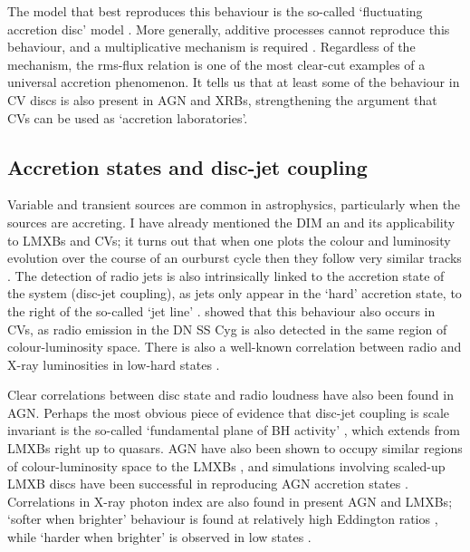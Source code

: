 The model that best reproduces this behaviour is the so-called
`fluctuating accretion disc' model \citep{lyubarskii1997,kotov2001,
arevalo2006,hogg2015}. More generally,
additive processes cannot reproduce this behaviour, and a multiplicative
mechanism is required \citep{uttley2005}. 
Regardless of the mechanism, the rms-flux relation is one of the most
clear-cut examples of a universal accretion phenomenon. 
It tells us that at least some of the behaviour in CV discs
is also present in AGN and XRBs, strengthening the argument that CVs
can be used as `accretion laboratories'. 


\subsection{Accretion states and disc-jet coupling}
\label{sec:disc-jet}

Variable and transient sources are common in astrophysics, particularly
when the sources are accreting. I have already mentioned the DIM an
and its applicability to LMXBs and CVs; it turns out that when one plots
the colour and luminosity evolution over the course of an ourburst cycle 
then they follow very similar tracks 
\citep[see figure~\ref{fig:kording_hid}, ][]{kordingDNjet2008}.
The detection of radio jets is also intrinsically linked to the accretion state
of the system (disc-jet coupling), as jets only appear in the `hard' accretion 
state, to the right of the so-called `jet line' \citep{fender2001,fender2004}.
\cite{kordingDNjet2008} showed that this behaviour also occurs in CVs, 
as radio emission in the DN SS Cyg is also detected in the same region 
of colour-luminosity space. There is also a well-known correlation between 
radio and X-ray luminosities in low-hard states \citep{gallo2003}.

Clear correlations between disc state and radio loudness have also been
found in AGN. Perhaps the most obvious piece of evidence that disc-jet coupling
is scale invariant is the so-called `fundamental plane of BH activity' 
\citep{merloni2003}, which extends from LMXBs right up to quasars. 
AGN have also been shown to occupy similar regions of colour-luminosity
space to the LMXBs \citep{kording2006}, and simulations involving
scaled-up LMXB discs have been successful in reproducing AGN accretion states
\citep{sobolewska2011}. Correlations
in X-ray photon index are also found in present AGN and LMXBs;
`softer when brighter' behaviour is found 
at relatively high Eddington ratios \citep{mchardy1999,gu2009},
while `harder when brighter' is observed in 
low states \citep{gu2009,dimitri_llagn,connolly2016}.

